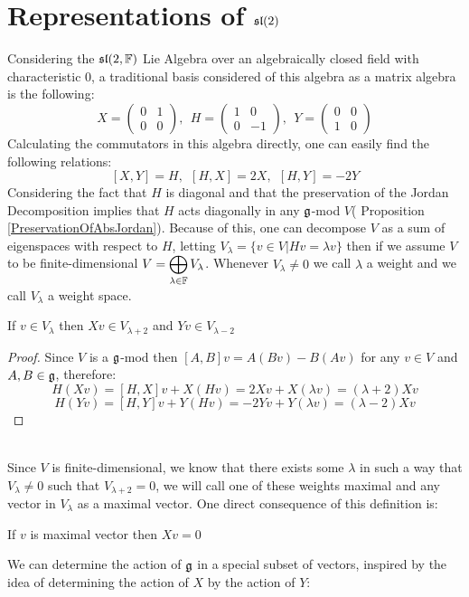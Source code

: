 \section{Representations of $\mathfrak{sl}(2)$}
Considering the $\mathfrak{sl}(2,\mathbb{F})$ Lie Algebra over an algebraically closed field with characteristic $0$, a traditional basis considered of this algebra as a matrix algebra is the following:
$$X = \begin{pmatrix}
0 & 1 \\
0 & 0 
\end{pmatrix}, \ \ H = \begin{pmatrix}
1 & 0 \\
0 & -1 
\end{pmatrix}, \ \ Y = \begin{pmatrix}
0 & 0 \\
1 & 0 
\end{pmatrix}$$
Calculating the commutators in this algebra directly, one can easily find the following relations:
$$[X,Y]=H, \ \ [H,X]=2X, \ \ [H,Y]=-2Y$$
Considering the fact that $H$ is diagonal and that the preservation of the Jordan Decomposition implies that $H$ acts diagonally in any $\mathfrak{g}$-mod $V$( Proposition \ref{PreservationOfAbsJordan}). Because of this, one can decompose $V$ as a sum of eigenspaces with respect to $H$, letting $V_\lambda = \{v \in V|Hv=\lambda v\}$ then if we assume $V$ to be finite-dimensional $V=\displaystyle\bigoplus_{\lambda \in \mathbb{F}} V_\lambda$. Whenever $V_\lambda \not=0$ we call $\lambda$ a weight and we call $V_\lambda$ a weight space.\\
\begin{lema}
	If $v \in V_\lambda$ then $Xv \in V_{\lambda+2}$ and $Yv \in V_{\lambda-2}$
\end{lema}
\begin{proof}
	Since $V$ is a $\mathfrak{g}$-mod then $[A,B]v = A(Bv)-B(Av)$ for any $v \in V$ and $A,B \in \mathfrak{g}$, therefore:
	$$H(Xv)=[H,X]v + X(Hv) = 2Xv + X(\lambda v) = (\lambda + 2)Xv$$
	$$H(Yv)=[H,Y]v + Y(Hv) = -2Yv + Y(\lambda v) = (\lambda - 2)Xv$$
\end{proof}\\
Since $V$ is finite-dimensional, we know that there exists some $\lambda$ in such a way that $V_\lambda\not=0$ such that $V_{\lambda+2}=0$, we will call one of these weights maximal and any vector in $V_\lambda$ as a maximal vector. One direct consequence of this definition is:
\begin{prop}
If $v$ is maximal vector then $Xv=0$
\end{prop}
We can determine the action of $\mathfrak{g}$ in a special subset of vectors, inspired by the idea of determining the action of $X$ by the action of $Y$:

